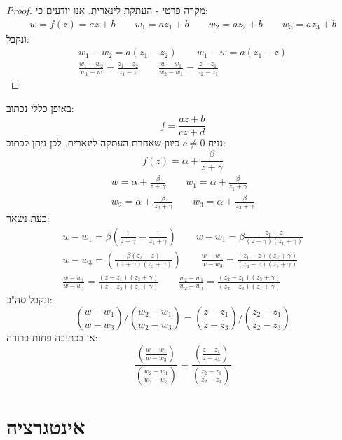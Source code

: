\documentclass{tstextbook}
\begin{document}
\begin{proof}
מקרה פרטי - העתקת לינארית. אנו יודעים כי:
$$\begin{gather}w = f(z)=az+b  \qquad w_{1}=az_{1}+b \qquad w_{2} = az_{2}+b \qquad w_{3}=az_{3}+b 
\end{gather}$$
ונקבל:
$$\begin{gather}w_{1}-w_{2} = a(z_{1}-z_{2}) \qquad w_{1}-w=a(z_{1}-z) \\\frac{w_{1}-w_{2}}{w_{1}-w}=\frac{z_{1}-z_{2}}{z_{1}-z} \qquad \frac{w-w_{1}}{w_{2}-w_{1}}=\frac{z-z_{1}}{z_{2}-z_{1}} 
\end{gather}$$

\end{proof}
באופן כללי נכתוב:
$$f=\frac{az+b}{cz+d}$$
נניח \(c\neq 0\) כיוון שאחרת העתקה לינארית. לכן ניתן לכתוב:
$$f(z)=\alpha+\frac{\beta}{z+\gamma}$$$$\begin{gather}w=\alpha+\frac{\beta}{z+\gamma} \qquad  w_{1}=\alpha+\frac{\beta}{z_{1}+\gamma}  \\w_{2}=\alpha+\frac{\beta}{z_{2}+\gamma} \qquad w_{3}=\alpha+\frac{\beta}{z_{3}+\gamma}
\end{gather}$$
כעת נשאר:
$$\begin{gather}w-w_{1}=\beta\left( \frac{1}{z+\gamma}-\frac{1}{z_{1}+\gamma} \right)  \qquad w-w_{1}=\beta \frac{z_{1}-z}{\left( z+\gamma \right)\left( z_{1}+\gamma \right)} \\w-w_{3} =\left( \frac{\beta (z_{3}-z)}{\left( z+\gamma \right)\left( z_{3}+\gamma \right)} \right) \qquad \frac{w-w_{1}}{w-w_{3}}=\frac{(z_{1}-z)\left( z_{3}+\gamma \right)}{(z_{3}-z)\left( z_{1}+\gamma \right)} \\\frac{w-w_{1}}{w-w_{3}} = \frac{(z-z_{1})\left( z_{3}+\gamma \right)}{(z-z_{3})\left( z_{1}+\gamma \right)} \qquad \frac{w_{2}-w_{1}}{w_{2}-w_{3}} = \frac{(z_{2}-z_{1})\left( z_{3}+\gamma \right)}{(z_{2}-z_{3})\left( z_{1}+\gamma \right)} 
\end{gather}$$
ונקבל סה"כ:
$$\left( \frac{w-w_{1}}{w-w_{3}}  \right)/  \left( \frac{w_{2} - w_{1}}{w_{2}-w_{3}} \right) = \left( \frac{z - z_{1}}{z-z_{3}} \right) / \left( \frac{z_{2} - z_{1}}{z_{2}-z_{3}} \right)$$
או בכתיבה פחות ברורה:
$$\frac{\left( \frac{w-w_{1}}{w-w_{3}}  \right)}{\left( \frac{w_{2} - w_{1}}{w_{2}-w_{3}} \right)} = \frac{\left( \frac{z - z_{1}}{z-z_{3}} \right)}{\left( \frac{z_{2} - z_{1}}{z_{2}-z_{3}} \right)}$$

\section{אינטגרציה}
\end{document}
